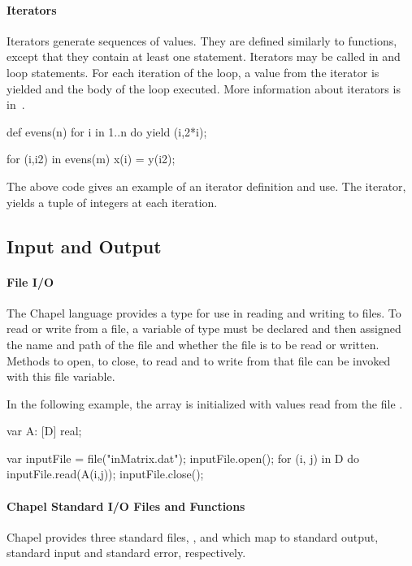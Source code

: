 \paragraph{Iterators}
Iterators generate sequences of values.  They are defined similarly to
functions, except that they contain at least one 
statement.  Iterators may be called in  and 
loop statements.  For each iteration of the loop, a value from the
iterator is yielded and the body of the loop executed.  More
information about iterators is in~.
\begin{example}
\begin{chapel}
def evens(n) {
  for i in 1..n do yield (i,2*i);
}

for (i,i2) in evens(m) {
  x(i) = y(i2);
}
\end{chapel}
The above code gives an example of an iterator definition and use.
The iterator,  yields a tuple of integers at each iteration.
\end{example}

\subsection{Input and Output}
\label{Intro_Input_and_Output}

\paragraph{File I/O}
The Chapel language provides a  type for use in reading and
writing to files.  To read or write from a file, a variable of 
type must be declared and then assigned the name and path of the file 
and whether the file is to be read or written.  Methods to open, to close,
to read and to write from that file can be invoked with this file
variable.

\begin{example}
In the following example, the array  is initialized with
values read from the file .
\begin{chapel}
var A: [D] real;

var inputFile = file("inMatrix.dat");
inputFile.open();
for (i, j) in D do inputFile.read(A(i,j));
inputFile.close();
\end{chapel}
\end{example}

\paragraph{Chapel Standard I/O Files and Functions}
Chapel provides three standard files, , 
and  which map to standard output, standard input and
standard error, respectively.

